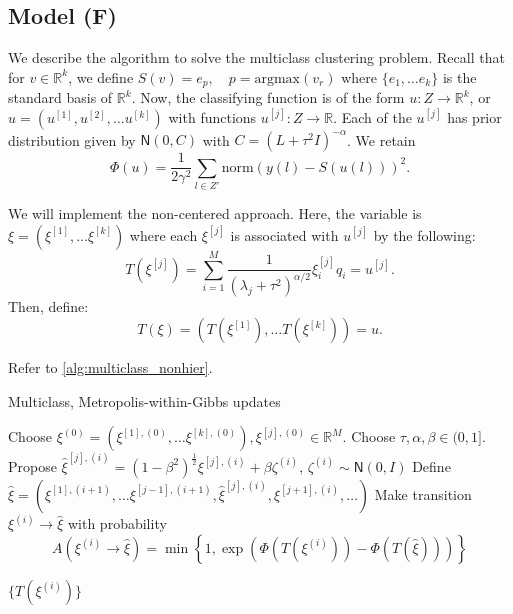 \documentclass{siamart1116}
\begin{document}
    \subsection{Model (F)} \label{sec:algorithms_multiclass}
        We describe the algorithm to solve the multiclass clustering problem. Recall that for $v \in \mathbb{R}^k$, we define $S(v) = e_p, \quad p = \text{argmax} (v_r)$ where $\{e_1, \ldots e_k\}$ is the standard basis of $\mathbb{R}^k$. Now, the classifying function is of the form $u: Z \to \mathbb{R}^k$, or $u = (u^{[1]}, u^{[2]}, \ldots u^{[k]})$ with functions $u^{[j]}: Z \to \mathbb{R}$. Each of the $u^{[j]}$ has prior distribution given by $\mathsf{N}(0, C)$ with $C = (L + \tau^2 I)^{-\alpha}$. We retain
        \[ \Phi(u) = \frac{1}{2\gamma^2}\sum_{l \in Z'} \text{norm}(y(l) - S(u(l)))^2. \]

        We will implement the non-centered approach. Here, the variable is $\xi = (\xi^{[1]}, \ldots \xi^{[k]})$ where each $\xi^{[j]}$ is associated with $u^{[j]}$ by the following:
        \[T(\xi^{[j]}) = \sum_{i=1}^M \frac{1}{(\lambda_j + \tau^2)^{\alpha/2}} \xi^{[j]}_i q_i = u^{[j]}.\]
        Then, define:
        \begin{equation}
        \label{eqn:multiclass_T}
        T(\xi) = (T(\xi^{[1]}), \ldots T(\xi^{[k]}) ) = u.
        \end{equation}

        Refer to \cref{alg:multiclass_nonhier}.
        
        \begin{algorithm}

        \caption{Multiclass, Metropolis-within-Gibbs updates}
        \label{alg:multiclass_nonhier}
        \begin{algorithmic}[1]
        \State Choose $\xi^{(0)} = (\xi^{[1],(0)}, \ldots \xi^{[k],(0)}), \xi^{[j],(0)} \in \mathbb{R}^M$. Choose $\tau, \alpha, \beta \in (0, 1]$. 
                \State Propose $\hat\xi^{[j],(i)} = (1-\beta^2)^{\frac{1}{2}}\xi^{[j],(i)} + \beta \zeta^{(i)}$, $\zeta^{(i)} \sim \mathsf{N}(0, I)$
                \State Define $\hat \xi = (\xi^{[1],(i+1)}, \ldots \xi^{[j-1],(i+1)}, \hat\xi^{[j],(i)}, \xi^{[j+1],(i)}, \ldots)$
                \State Make transition $\xi^{(i)} \to \hat\xi$ with probability
                \[ A(\xi^{(i)} \to \hat\xi) = \min\left\{1, \exp\left(\Phi(T(\xi^{(i)})) - \Phi(T(\hat \xi))\right) \right\}\]

            \EndFor
        \EndFor

        \State \Return $\{T(\xi^{(i)})\}$
        
        \end{algorithmic}
        \end{algorithm}
\end{document}
